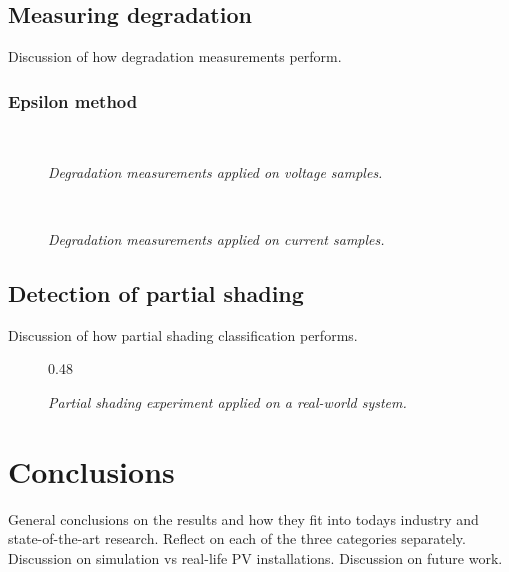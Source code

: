\section{Measuring degradation}
Discussion of how degradation measurements perform.

\subsection{Epsilon method}
\begin{figure}[here]
\centering
{}
~
\caption[Performance of distance-based method (voltage)]{\emph{Degradation measurements applied on voltage samples.}}
\end{figure}

\begin{figure}[here]
\centering
{}
~
\caption[Performance of distance-based method (current)]{\emph{Degradation measurements applied on current samples.}}
\end{figure}

\section{Detection of partial shading}
Discussion of how partial shading classification performs.

\begin{figure}[here]
\centering
{}
{0.48}
~
\caption[Partial shading experiment]{\emph{Partial shading experiment applied on a real-world system.}}
\end{figure}

\chapter{Conclusions}
General conclusions on the results and how they fit into todays industry and state-of-the-art research.
Reflect on each of the three categories separately.
Discussion on simulation vs real-life PV installations.
Discussion on future work.





